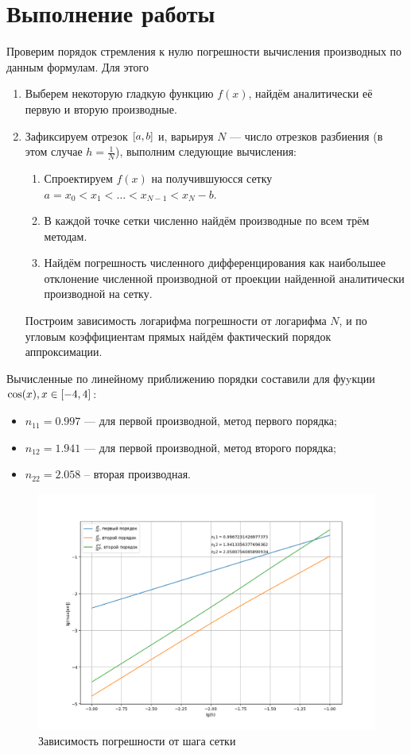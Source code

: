 \section{Выполнение работы}
Проверим порядок стремления к нулю погрешности вычисления производных по данным формулам. Для этого
\begin{enumerate}
    \item Выберем некоторую гладкую функцию $f(x)$, найдём аналитически её первую и вторую производные.
    \item Зафиксируем отрезок $\left[{a, b}\right]$ и, варьируя $N$ --- число отрезков разбиения (в этом случае $h = \frac{1}{N}$), выполним следующие вычисления:
    \begin{enumerate}
        \item Спроектируем $f(x)$ на получившуюсся сетку $a = x_0 < x_1 < \ldots < x_{N-1} < x_N - b$.
        \item В каждой точке сетки численно найдём производные по всем трём методам.
        \item Найдём погрешность численного дифференцирования как наибольшее отклонение численной производной от проекции найденной аналитически производной на сетку.
    \end{enumerate}
    Построим зависимость логарифма погрешности от логарифма $N$, и по угловым коэффициентам прямых найдём фактический порядок аппроксимации.
\end{enumerate}
Вычисленные по линейному приближению порядки составили для фуyкции $\cos(x), x \in \left[{-4, 4}\right]$:
\begin{itemize}
    \item $n_{11} = 0.997$ --- для первой производной, метод первого порядка;
    \item $n_{12} = 1.941$ --- для первой производной, метод второго порядка;
    \item $n_{22} = 2.058$ -- вторая производная.
\end{itemize}

\begin{figure}[h]
    \includegraphics[width=\textwidth]{Figure_1.png}
    \caption{Зависимость погрешности от шага сетки}
\end{figure}